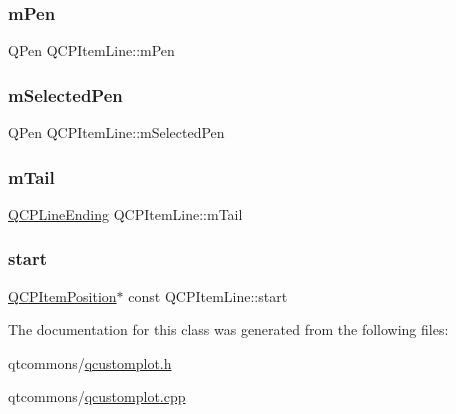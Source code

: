 \subsubsection{\texorpdfstring{mPen}{mPen}}
{\footnotesize\ttfamily Q\+Pen Q\+C\+P\+Item\+Line\+::m\+Pen\hspace{0.3cm}{\ttfamily [protected]}}

\mbox{\label{class_q_c_p_item_line_aff858ad6dde3b90024814ca4b116f278}} 
\subsubsection{\texorpdfstring{mSelectedPen}{mSelectedPen}}
{\footnotesize\ttfamily Q\+Pen Q\+C\+P\+Item\+Line\+::m\+Selected\+Pen\hspace{0.3cm}{\ttfamily [protected]}}

\mbox{\label{class_q_c_p_item_line_ab8ed61dfe15bbb1cbf9b95eae95e242f}} 
\subsubsection{\texorpdfstring{mTail}{mTail}}
{\footnotesize\ttfamily \mbox{\hyperlink{class_q_c_p_line_ending}{Q\+C\+P\+Line\+Ending}} Q\+C\+P\+Item\+Line\+::m\+Tail\hspace{0.3cm}{\ttfamily [protected]}}

\mbox{\label{class_q_c_p_item_line_a602da607a09498b0f152ada1d6851bc5}} 
\subsubsection{\texorpdfstring{start}{start}}
{\footnotesize\ttfamily \mbox{\hyperlink{class_q_c_p_item_position}{Q\+C\+P\+Item\+Position}}$\ast$ const Q\+C\+P\+Item\+Line\+::start}



The documentation for this class was generated from the following files\+:\begin{DoxyCompactItemize}
\item 
qtcommons/\mbox{\hyperlink{qcustomplot_8h}{qcustomplot.\+h}}\item 
qtcommons/\mbox{\hyperlink{qcustomplot_8cpp}{qcustomplot.\+cpp}}\end{DoxyCompactItemize}

